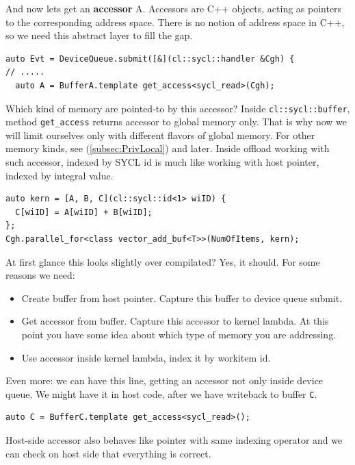 \documentclass[a4paper,12pt,oneside]{article}
\begin{document}
And now lets get an \textbf{accessor} A. Accessors are C++ objects, acting as pointers to the corresponding address space. There is no notion of address space in C++, so we need this abstract layer to fill the gap.

\begin{lstlisting}
auto Evt = DeviceQueue.submit([&](cl::sycl::handler &Cgh) {
// .....
  auto A = BufferA.template get_access<sycl_read>(Cgh);
\end{lstlisting}

Which kind of memory are pointed-to by this accessor? Inside \lstinline!cl::sycl::buffer!, method \lstinline!get_access! returns accessor to global memory only. That is why now we will limit ourselves only with different flavors of global memory. For other memory kinds, see (\ref{subsec:PrivLocal}) and later. Inside offload working with such accessor, indexed by SYCL id is much like working with host pointer, indexed by integral value.

\begin{lstlisting}
auto kern = [A, B, C](cl::sycl::id<1> wiID) {
  C[wiID] = A[wiID] + B[wiID];
};
Cgh.parallel_for<class vector_add_buf<T>>(NumOfItems, kern);
\end{lstlisting}

At first glance this looks slightly over compilated? Yes, it should. For some reasons we need:

\begin{itemize}
\item Create buffer from host pointer. Capture this buffer to device queue submit.
\item Get accessor from buffer. Capture this accessor to kernel lambda. At this point you have some idea about which type of memory you are addressing.
\item Use accessor inside kernel lambda, index it by workitem id.
\end{itemize}

Even more: we can have this line, getting an accessor not only inside device queue. We might have it in host code, after we have writeback to buffer \lstinline!C!.

\begin{lstlisting}
auto C = BufferC.template get_access<sycl_read>();
\end{lstlisting}

Host-side accessor also behaves like pointer with same indexing operator and we can check on host side that everything is correct.
\end{document}
